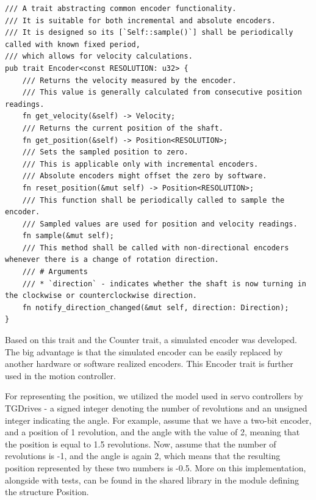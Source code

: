 \newpage
\begin{lstlisting}[caption={Encoder trait for abstracting encoders.},label=lst:encoder_trait]
/// A trait abstracting common encoder functionality.
/// It is suitable for both incremental and absolute encoders.
/// It is designed so its [`Self::sample()`] shall be periodically called with known fixed period,
/// which allows for velocity calculations.
pub trait Encoder<const RESOLUTION: u32> {
    /// Returns the velocity measured by the encoder.
    /// This value is generally calculated from consecutive position readings.
    fn get_velocity(&self) -> Velocity;
    /// Returns the current position of the shaft.
    fn get_position(&self) -> Position<RESOLUTION>;
    /// Sets the sampled position to zero.
    /// This is applicable only with incremental encoders.
    /// Absolute encoders might offset the zero by software.
    fn reset_position(&mut self) -> Position<RESOLUTION>;
    /// This function shall be periodically called to sample the encoder.
    /// Sampled values are used for position and velocity readings.
    fn sample(&mut self);
    /// This method shall be called with non-directional encoders whenever there is a change of rotation direction.
    /// # Arguments
    /// * `direction` - indicates whether the shaft is now turning in the clockwise or counterclockwise direction.
    fn notify_direction_changed(&mut self, direction: Direction);
}
\end{lstlisting}

Based on this trait and the Counter trait, a simulated encoder was developed.
The big advantage is that the simulated encoder can be easily replaced by another hardware or software realized encoders.
This Encoder trait is further used in the motion controller.

For representing the position, we utilized the model used in servo controllers by TGDrives - a signed integer denoting the number of revolutions and an unsigned integer indicating the angle.
For example, assume that we have a two-bit encoder, and a position of 1 revolution, and the angle with the value of 2, meaning that the position is equal to 1.5 revolutions.
Now, assume that the number of revolutions is -1, and the angle is again 2, which means that the resulting position represented by these two numbers is -0.5.
More on this implementation, alongside with tests, can be found in the shared library in the module defining the structure Position.

